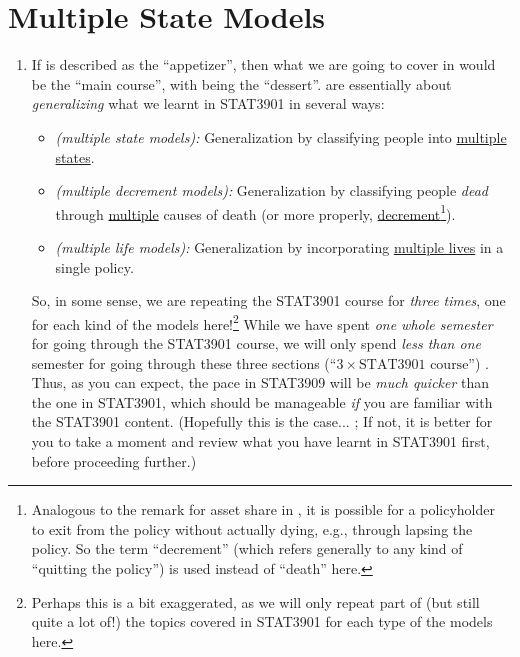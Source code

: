 \section{Multiple State Models}
\label{sect:mult-state-models}
\begin{enumerate}
\item If  is described as the ``appetizer'', then what
we are going to cover in
 would
be the ``main course'', with  being the ``dessert''.
are essentially about \emph{generalizing} what we learnt in STAT3901 in several
ways:
\begin{itemize}
\item \emph{ (multiple state models):}
Generalization by classifying people into \underline{multiple states}.

\item \emph{ (multiple decrement models):}
Generalization by classifying people \emph{dead} through
\underline{multiple} causes of death (or more properly,
\underline{decrement}\footnote{Analogous to the remark for asset share in
, it is possible for a policyholder to exit from the
policy without actually dying, e.g., through lapsing the policy. So the term
``decrement'' (which refers generally to any kind of ``quitting the policy'')
is used instead of ``death'' here.}).

\item \emph{ (multiple life models):}
Generalization by incorporating \underline{multiple lives} in a single policy.
\end{itemize}
So, in some sense, we are repeating the STAT3901 course for \emph{three times},
one for each kind of the models here!\footnote{Perhaps this is a bit
exaggerated, as we will only repeat part of (but still quite a lot of!) the
topics covered in STAT3901 for each type of the models here.} While we have
spent \emph{one whole semester} for going through the STAT3901 course, we will
only spend \emph{less than one} semester for going through these three sections
(``\(3\times \text{STAT3901 course}\)'') .
Thus, as you can expect, the pace in STAT3909 will be \emph{much quicker}
 than the one in STAT3901, which should be
manageable \emph{if} you are familiar with the STAT3901 content. (Hopefully this
is the case...  ; \warn{} If not, it is better
for you to take a moment and review  what you have learnt
in STAT3901 first, before proceeding further.)


\end{enumerate}
